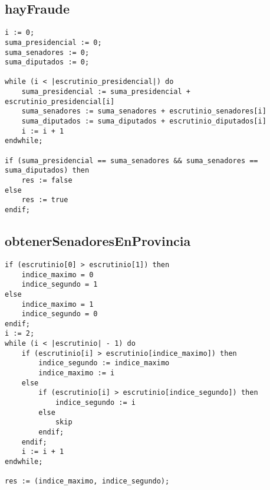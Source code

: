 \documentclass[10pt,a4paper]{article}
\begin{document}
\subsection{hayFraude}
\begin{minipage}[t]{\textwidth}
    \begin{lstlisting}[label=code:for]
i := 0;
suma_presidencial := 0;
suma_senadores := 0;
suma_diputados := 0;

while (i < |escrutinio_presidencial|) do
    suma_presidencial := suma_presidencial + escrutinio_presidencial[i]
    suma_senadores := suma_senadores + escrutinio_senadores[i]
    suma_diputados := suma_diputados + escrutinio_diputados[i]
    i := i + 1
endwhile;

if (suma_presidencial == suma_senadores && suma_senadores == suma_diputados) then
	res := false
else
    res := true
endif;
    \end{lstlisting}
\end{minipage}

\subsection{obtenerSenadoresEnProvincia}
\begin{minipage}[t]{\textwidth}
    \begin{lstlisting}[label=code:for]
if (escrutinio[0] > escrutinio[1]) then
    indice_maximo = 0
    indice_segundo = 1
else
    indice_maximo = 1
    indice_segundo = 0
endif;
i := 2;
while (i < |escrutinio| - 1) do
    if (escrutinio[i] > escrutinio[indice_maximo]) then
        indice_segundo := indice_maximo
        indice_maximo := i
    else
        if (escrutinio[i] > escrutinio[indice_segundo]) then
            indice_segundo := i
        else
            skip
        endif;
    endif;
    i := i + 1
endwhile;

res := (indice_maximo, indice_segundo);
    \end{lstlisting}
\end{minipage}

\end{document}
